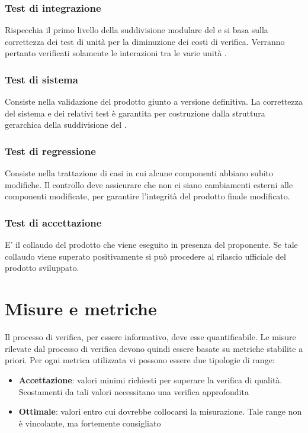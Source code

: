 \documentclass[12pt,a4paper]{article}
\begin{document}
\subsubsection{Test di integrazione}
Rispecchia il primo livello della suddivisione modulare del  e si basa sulla correttezza dei test di unità per la diminuzione dei costi di verifica. Verranno pertanto verificati solamente le interazioni tra le varie unità .

\subsubsection{Test di sistema}
Consiste nella validazione del prodotto giunto a versione definitiva. La correttezza del sistema e dei relativi test è garantita per costruzione dalla struttura gerarchica della suddivisione del .
\subsubsection{Test di regressione}
Consiste nella trattazione di casi in cui alcune componenti abbiano subito modifiche. Il controllo deve assicurare che non ci siano cambiamenti esterni alle componenti modificate, per garantire l'integrità del prodotto finale modificato.
\subsubsection{Test di accettazione}
E' il collaudo del prodotto  che viene eseguito in presenza del proponente. Se tale collaudo viene superato positivamente si può procedere al rilascio ufficiale del prodotto sviluppato. 

\newpage
\section{Misure e metriche}\label{metriche}
Il processo di verifica, per essere informativo, deve esse quantificabile. Le misure rilevate dal processo di verifica devono quindi essere basate su metriche stabilite a priori. Per ogni metrica utilizzata vi possono essere due tipologie di range:
\begin{itemize}
\item \textbf{Accettazione}: valori minimi richiesti per superare la verifica di qualità. Scostamenti da tali valori necessitano una verifica approfondita
\item \textbf{Ottimale}: valori entro cui dovrebbe collocarsi la misurazione. Tale range non è vincolante, ma fortemente consigliato
\end{itemize}
\end{document}
